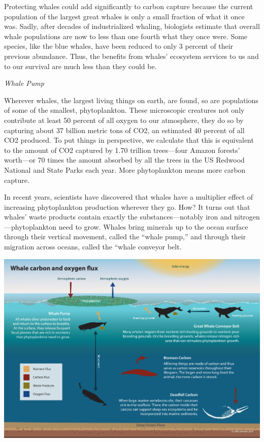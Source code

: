 \documentclass[
]{book}
\begin{document}
Protecting whales could add significantly to carbon capture because the current population of the largest great whales is only a small fraction of what it once was. Sadly, after decades of industrialized whaling, biologists estimate that overall whale populations are now to less than one fourth what they once were. Some species, like the blue whales, have been reduced to only 3 percent of their previous abundance. Thus, the benefits from whales' ecosystem services to us and to our survival are much less than they could be.

\emph{Whale Pump}

Wherever whales, the largest living things on earth, are found, so are populations of some of the smallest, phytoplankton. These microscopic creatures not only contribute at least 50 percent of all oxygen to our atmosphere, they do so by capturing about 37 billion metric tons of CO2, an estimated 40 percent of all CO2 produced. To put things in perspective, we calculate that this is equivalent to the amount of CO2 captured by 1.70 trillion trees---four Amazon forests' worth---or 70 times the amount absorbed by all the trees in the US Redwood National and State Parks each year. More phytoplankton means more carbon capture.

In recent years, scientists have discovered that whales have a multiplier effect of increasing phytoplankton production wherever they go. How? It turns out that whales' waste products contain exactly the substances---notably iron and nitrogen---phytoplankton need to grow. Whales bring minerals up to the ocean surface through their vertical movement, called the ``whale pump,'' and through their migration across oceans, called the ``whale conveyor belt.

\includegraphics{fig/whale_flux.jpg}
\end{document}
